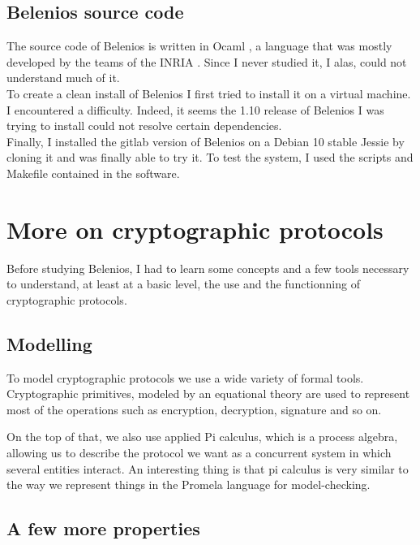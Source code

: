 \documentclass[12pt, a4paper]{report}
\begin{document}
\subsection{Belenios source code}

The source code of Belenios is written in Ocaml \cite{WEBSITE:7}, a language that was mostly developed by the teams of the INRIA \cite{WEBSITE:8}. Since I never studied it, I alas, could not understand much of it.\\ 

To create a clean install of Belenios I first tried to install it on a virtual machine. I encountered a difficulty. Indeed, it seems the 1.10 release of Belenios I was trying to install could not resolve certain dependencies.\\

Finally, I installed the gitlab version of Belenios on a Debian 10 stable Jessie by cloning it and was finally able to try it. To test the system, I used the scripts and Makefile contained in the software.

\section{More on cryptographic protocols}

Before studying Belenios, I had to learn some concepts and a few tools necessary to understand, at least at a basic level, the use and the functionning of cryptographic protocols. \cite{WEBSITE:9} 

\subsection{Modelling}

To model cryptographic protocols we use a wide variety of formal tools.
Cryptographic primitives, modeled by an equational theory are used to represent most of the operations such as encryption, decryption, signature and so on.

On the top of that, we also use applied Pi calculus, which is a process algebra, allowing us to describe the protocol we want as a concurrent system in which several entities interact. An interesting thing is that pi calculus is very similar to the way we represent things in the Promela language for model-checking. 

\subsection{A few more properties}
\end{document}
